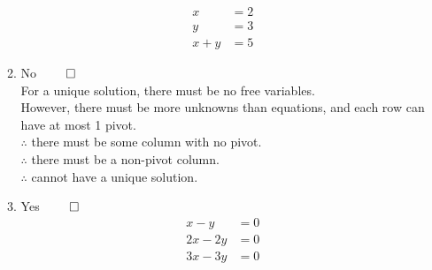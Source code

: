 \documentclass[12pt, a4paper]{article}
\begin{document}
\begin{enumerate}[Q\arabic*.]
\begin{enumerate}[(\alph*)]
\begin{align*}
          x &= 2 \\
          y &= 3 \\
          x + y &= 5
        \end{align*}
      \item No $\qed$ \\
        For a unique solution, there must be no free variables.\\
        However, there must be more unknowns than equations, and each row can have at most 1 pivot.\\
        $\therefore$ there must be some column with no pivot. \\
        $\therefore$ there must be a non-pivot column. \\
        $\therefore$ cannot have a unique solution.
      \item Yes $\qed$
        \begin{align*}
          x - y &= 0 \\
          2x-2y &= 0\\
          3x-3y &= 0
        \end{align*}
    \end{enumerate}


\end{enumerate}
\end{document}
